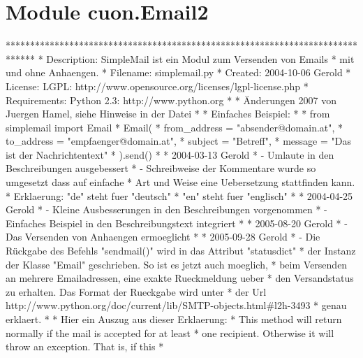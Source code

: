 %
%
%


\section{Module cuon.Email2}

    \label{cuon:Email2}
******************************************************************************
* Description:  SimpleMail ist ein Modul zum Versenden von Emails *
mit und ohne Anhaengen. * Filename:     simplemail.py * Created:      
2004-10-06 Gerold * License:      LGPL: 
http://www.opensource.org/licenses/lgpl-license.php * Requirements: Python 
2.3:  http://www.python.org * * Änderungen 2007 von Juergen Hamel, siehe 
Hinweise in der Datei * * Einfaches Beispiel: * *   from simplemail import 
Email *   Email( *       from\_address = "absender@domain.at", *       
to\_address = "empfaenger@domain.at", *       subject = "Betreff", *       
message = "Das ist der Nachrichtentext" *   ).send() * * 2004-03-13 Gerold 
*   - Umlaute in den Beschreibungen ausgebessert *   - Schreibweise der 
Kommentare wurde so umgesetzt dass auf einfache *     Art und Weise eine 
Uebersetzung stattfinden kann. *     Erklaerung: "de" steht fuer "deutsch" 
*                 "en" steht fuer "englisch" * * 2004-04-25 Gerold *   - 
Kleine Ausbesserungen in den Beschreibungen vorgenommen *   - Einfaches 
Beispiel in den Beschreibungstext integriert * * 2005-08-20 Gerold *   - 
Das Versenden von Anhaengen ermoeglicht * * 2005-09-28 Gerold *   - Die 
Rückgabe des Befehls "sendmail()" wird in das Attribut "statusdict" *     
der Instanz der Klasse "Email" geschrieben. So ist es jetzt auch moeglich, 
*     beim Versenden an mehrere Emailadressen, eine exakte Rueckmeldung 
ueber *     den Versandstatus zu erhalten. Das Format der Rueckgabe wird 
unter *     der Url 
http://www.python.org/doc/current/lib/SMTP-objects.html\#l2h-3493 *     
genau erklaert. * *     Hier ein Auszug aus dieser Erklaerung: *     This 
method will return normally if the mail is accepted for at least *     one 
recipient. Otherwise it will throw an exception. That is, if this *     
